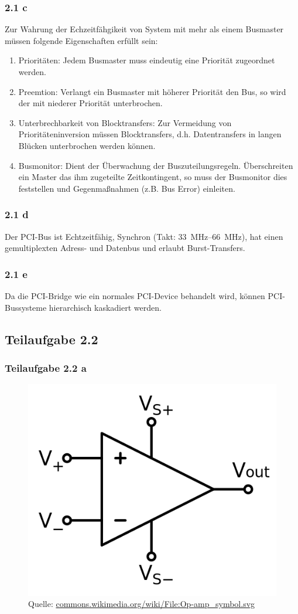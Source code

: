 \documentclass[a4paper]{scrartcl}
\begin{document}
  \subsubsection*{2.1 c}
  Zur Wahrung der Echzeitfähgikeit von System mit mehr als einem Busmaster
  müssen folgende Eigenschaften erfüllt sein:
  \begin{enumerate}
      \item Prioritäten: Jedem Busmaster muss eindeutig eine Priorität zugeordnet werden.
      \item Preemtion: Verlangt ein Busmaster mit höherer Priorität den Bus, so wird der mit niederer Priorität unterbrochen.
      \item Unterbrechbarkeit von Blocktransfers: Zur Vermeidung von Prioritäteninversion müssen Blocktransfers, d.h. Datentransfers in langen Blücken unterbrochen werden können.
      \item Busmonitor: Dient der Überwachung der Buszuteilungsregeln. Überschreiten ein Master das ihm zugeteilte Zeitkontingent, so muss der Busmonitor dies feststellen und Gegenmaßnahmen (z.B. Bus Error) einleiten.
  \end{enumerate}

  \subsubsection*{2.1 d}
  Der PCI-Bus ist Echtzeitfähig,
  Synchron (Takt: \SIrange[range-phrase = --]{33}{66}{\mega\hertz}),
  hat einen gemultiplexten Adress- und Datenbus und erlaubt Burst-Transfers.

  \subsubsection*{2.1 e}
  Da die PCI-Bridge wie ein normales PCI-Device behandelt wird, können
  PCI-Bussysteme hierarchisch kaskadiert werden.

  \subsection*{Teilaufgabe 2.2}
  \subsubsection*{Teilaufgabe 2.2 a}
  \begin{figure}[h]
      \centering
      \includegraphics*[width=0.5\linewidth, keepaspectratio]{op-verstaerker.png}
      \caption{Quelle: \href{https://commons.wikimedia.org/wiki/File:Op-amp_symbol.svg}{commons.wikimedia.org/wiki/File:Op-amp\_symbol.svg}}
      \label{fig:operationsverstaerker}
  \end{figure}
\end{document}
